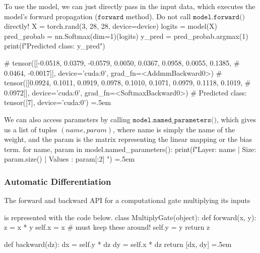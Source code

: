\documentclass{article}
\newenvironment{cverbatim}
 {\SaveVerbatim{cverb}}
 {\endSaveVerbatim
  \flushleft\fboxrule=0pt\fboxsep=.5em
  \colorbox{cverbbg}{%
    \makebox[\dimexpr\linewidth-2\fboxsep][l]{\BUseVerbatim{cverb}}%
  }
  \endflushleft
}
\theoremstyle{definition}
\theoremstyle{remark}
\theoremstyle{definition}
\begin{document}
To use the model, we can just directly pass in the input data, which executes the model's forward propagation ($\texttt{forward}$ method). Do not call $\texttt{model.forward()}$ directly! 
\begin{cverbatim}
X = torch.rand(3, 28, 28, device=device)
logits = model(X)
pred_probab = nn.Softmax(dim=1)(logits)
y_pred = pred_probab.argmax(1)
print(f"Predicted class: {y_pred}")

# tensor([[-0.0518,  0.0379, -0.0579,  0.0050,  0.0367,  0.0958,  0.0055,  0.1385,
#           0.0464, -0.0017]], device='cuda:0', grad_fn=<AddmmBackward0>)
# tensor([[0.0924, 0.1011, 0.0919, 0.0978, 0.1010, 0.1071, 0.0979, 0.1118, 0.1019,
#          0.0972]], device='cuda:0', grad_fn=<SoftmaxBackward0>)
# Predicted class: tensor([7], device='cuda:0')
\end{cverbatim}

We can also access parameters by calling $\texttt{model.named\_parameters()}$, which gives us a list of tuples $(name, param)$, where name is simply the name of the weight, and the param is the matrix representing the linear mapping or the bias term. 
\begin{cverbatim}
for name, param in model.named_parameters():
    print(f"Layer: {name} | Size: {param.size()} | Values : {param[:2]} \n")
\end{cverbatim}

\subsubsection{Automatic Differentiation}

The forward and backward API for a computational gate multiplying its inputs 
\begin{center}
\end{center}
is represented with the code below. 
\begin{cverbatim}
class MultiplyGate(object): 
    def forward(x, y): 
        z = x * y 
        self.x = x      # must keep these around! 
        self.y = y 
        return z 

    def backward(dz): 
        dx = self.y * dz  
        dy = self.x * dz 
        return [dx, dy] 
\end{cverbatim}
\end{document}
